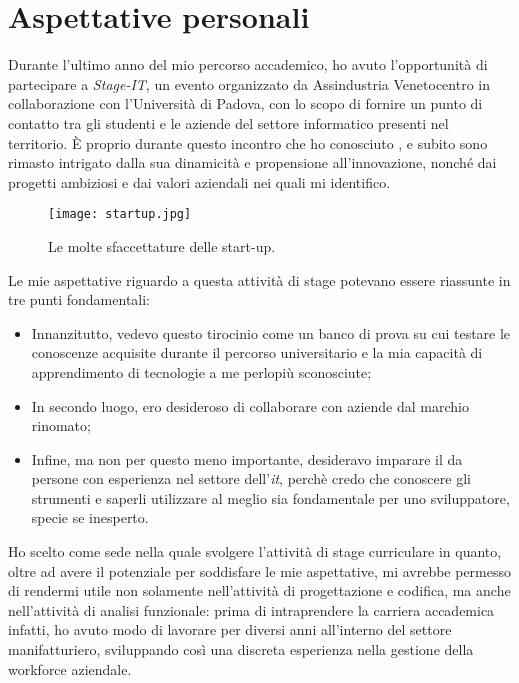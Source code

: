 \section{Aspettative personali}
Durante l'ultimo anno del mio percorso accademico, ho avuto l'opportunità di partecipare a \textit{Stage-IT}, un evento organizzato da Assindustria Venetocentro in collaborazione con l'Università di Padova, con lo scopo di fornire un punto di contatto tra gli studenti e le aziende del settore informatico presenti nel territorio.
\`E proprio durante questo incontro che ho conosciuto \AD , e subito sono rimasto intrigato dalla sua dinamicità e propensione all'innovazione, nonché dai progetti ambiziosi e dai valori aziendali nei quali mi identifico.\\
\begin{figure}[h!]
\texttt{[image: startup.jpg]}
\centering
\caption{Le molte sfaccettature delle start-up.} 
\label{fig:startup}
\end{figure}

Le mie aspettative riguardo a questa attività di stage potevano essere riassunte in tre punti fondamentali:
\begin{itemize}
\item Innanzitutto, vedevo questo tirocinio come un banco di prova su cui testare le conoscenze acquisite durante il percorso universitario e la mia capacità di apprendimento di tecnologie a me perlopiù sconosciute;
\item In secondo luogo, ero desideroso di collaborare con aziende dal marchio rinomato;
\item Infine, ma non per questo meno importante, desideravo imparare il  da persone con esperienza nel settore dell'\textit{\acrshort{it}}, perchè credo che conoscere gli strumenti e saperli utilizzare al meglio sia fondamentale per uno sviluppatore, specie se inesperto.
\end{itemize}
Ho scelto \AD{} come sede nella quale svolgere l'attività di stage curriculare in quanto, oltre ad avere il potenziale per soddisfare le mie aspettative, mi avrebbe permesso di rendermi utile non solamente nell'attività di progettazione e codifica, ma anche nell'attività di analisi funzionale: prima di intraprendere la carriera accademica infatti, ho avuto modo di lavorare per diversi anni all'interno del settore manifatturiero, sviluppando così una discreta esperienza nella gestione della workforce aziendale.
